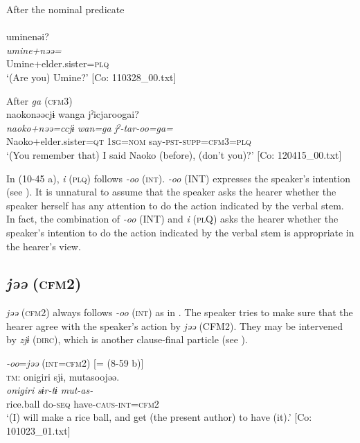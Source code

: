   \ex After the nominal predicate\\\\
      \glll    uminenəi?\\
    \textit{umine+nəə=}\\
    Umine+elder.sister=\textsc{plq}\\
\glt     ‘(Are you) Umine?’  [Co: 110328\_00.txt]

  \ex After \textit{ga} (\textsc{cfm}3)\\
      \glll    naokonəəcjɨ  wanga  jˀicjaroogai?\\
    \textit{naoko+nəə=ccjɨ}  \textit{wan=ga}  \textit{jˀ-tar-oo=ga=}\\
    Naoko+elder.sister=\textsc{qt}  1\textsc{sg}=\textsc{nom}  say-\textsc{pst}-\textsc{supp}=\textsc{cfm}3=\textsc{plq}\\
  \glt     ‘(You remember that) I said Naoko (before), (don’t you)?’  [Co: 120415\_00.txt]
  \z
\z

In (10-45 a), \textit{i} (\textsc{plq}) follows \textit{{}-oo} (\textsc{int}). \textit{{}-oo} (INT) expresses the speaker’s intention (see ). It is unnatural to assume that the speaker asks the hearer whether the speaker herself has any attention to do the action indicated by the verbal stem. In fact, the combination of \textit{{}-oo} (INT) and \textit{i} (\textsc{pl}Q) asks the hearer whether the speaker’s intention to do the action indicated by the verbal stem is appropriate in the hearer’s view.

\subsection{\textit{jəə} (\textsc{cfm}2)}\label{sec:10.3.4}

\textit{jəə} (\textsc{cfm}2) always follows \textit{-oo} (\textsc{int}) as in . The speaker tries to make sure that the hearer agree with the speaker’s action by \textit{jəə} (CFM2). They may be intervened by \textit{zjɨ} (\textsc{dirc}), which is another clause-final particle (see ).

\ea\label{ex:10.46}   \textit{{}-oo}=\textit{jəə} (\textsc{int}=\textsc{cfm}2) [= (8-59 b)]\\
  \ea \textsc{tm}:
      \glll    {\textbar}onigiri{\textbar}  sjɨ,  mutasoojəə.\\
      \textit{onigiri}  \textit{sɨr-tɨ}  \textit{mut-as-}\\
      rice.ball  do-\textsc{seq}  have-\textsc{caus}-\textsc{int}=\textsc{cfm}2\\
      \glt       ‘(I) will make a rice ball, and get (the present author) to have (it).’ [Co: 101023\_01.txt]

